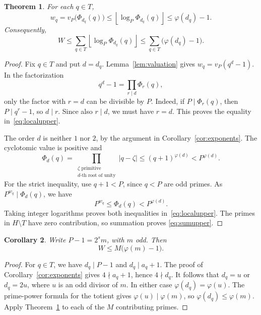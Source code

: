 \documentclass[11pt]{article}
\newtheorem{theorem}{Theorem}
\newtheorem{corollary}[theorem]{Corollary}
\theoremstyle{remark}
\begin{document}
\begin{theorem}\label{thm:upper}
For each $q\in T$,
\begin{equation}\label{eq:localupper}
 w_q=v_P\bigl(\Phi_{d_q}(q)\bigr)
 \le\left\lfloor\log_P\Phi_{d_q}(q)\right\rfloor
 \le\varphi(d_q)-1.
\end{equation}
Consequently,
\begin{equation}\label{eq:sumupper}
 \boxed{W\le
 \sum_{q\in T}\left\lfloor\log_P\Phi_{d_q}(q)\right\rfloor
 \le\sum_{q\in T}\bigl(\varphi(d_q)-1\bigr).}
\end{equation}
\end{theorem}
\begin{proof}
Fix $q\in T$ and put $d=d_q$. Lemma~\ref{lem:valuation} gives
$w_q=v_P(q^d-1)$. In the factorization
\[
 q^d-1=\prod_{r\mid d}\Phi_r(q),
\]
only the factor with $r=d$ can be divisible by $P$. Indeed, if
$P\mid\Phi_r(q)$, then $P\mid q^r-1$, so $d\mid r$. Since also $r\mid d$,
we must have $r=d$. This proves the equality in~\eqref{eq:localupper}.

The order $d$ is neither $1$ nor $2$, by the argument in
Corollary~\ref{cor:exponents}. The cyclotomic value is positive and
\[
 \Phi_d(q)=\prod_{\substack{\zeta\text{ primitive}\\d\text{-th root of unity}}}
 |q-\zeta|\le(q+1)^{\varphi(d)}<P^{\varphi(d)}.
\]
For the strict inequality, use $q+1<P$, since $q<P$ are odd primes.
As $P^{w_q}\mid\Phi_d(q)$, we have
\[
 P^{w_q}\le\Phi_d(q)<P^{\varphi(d)}.
\]
Taking integer logarithms proves both inequalities in~\eqref{eq:localupper}.
The primes in $H\setminus T$ have zero contribution, so summation proves
\eqref{eq:sumupper}.
\end{proof}

\begin{corollary}\label{cor:oddpartupper}
Write $P-1=2^s m$, with $m$ odd. Then
\[
 \boxed{W\le M\bigl(\varphi(m)-1\bigr).}
\]
\end{corollary}
\begin{proof}
For $q\in T$, we have $d_q\mid P-1$ and $d_q\mid a_q+1$.
The proof of Corollary~\ref{cor:exponents} gives $4\nmid a_q+1$, hence
$4\nmid d_q$. It follows that $d_q=u$ or $d_q=2u$, where $u$ is an odd
divisor of $m$. In either case $\varphi(d_q)=\varphi(u)$. The prime-power
formula for the totient gives $\varphi(u)\mid\varphi(m)$, so
$\varphi(d_q)\le\varphi(m)$. Apply Theorem~\ref{thm:upper} to each of the
$M$ contributing primes.
\end{proof}
\end{document}
